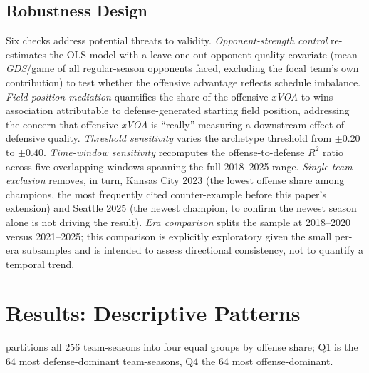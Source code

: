 \documentclass[12pt,a4paper]{article}
\newcommand{\xvoa}{\textit{xVOA}}
\newcommand{\gds}{\textit{GDS}}
\begin{document}
\subsection{Robustness Design}
\label{sec:robustness-design}

Six checks address potential threats to validity. \textit{Opponent-strength control} re-estimates the OLS model with a leave-one-out opponent-quality covariate (mean \gds{}/game of all regular-season opponents faced, excluding the focal team's own contribution) to test whether the offensive advantage reflects schedule imbalance. \textit{Field-position mediation} \citep{baron1986moderator} quantifies the share of the offensive-\xvoa{}-to-wins association attributable to defense-generated starting field position, addressing the concern that offensive \xvoa{} is ``really'' measuring a downstream effect of defensive quality. \textit{Threshold sensitivity} varies the archetype threshold from $\pm0.20$ to $\pm0.40$. \textit{Time-window sensitivity} recomputes the offense-to-defense $R^2$ ratio across five overlapping windows spanning the full 2018--2025 range. \textit{Single-team exclusion} removes, in turn, Kansas City 2023 (the lowest offense share among champions, the most frequently cited counter-example before this paper's extension) and Seattle 2025 (the newest champion, to confirm the newest season alone is not driving the result). \textit{Era comparison} splits the sample at 2018--2020 versus 2021--2025; this comparison is explicitly exploratory given the small per-era subsamples and is intended to assess directional consistency, not to quantify a temporal trend.

\section{Results: Descriptive Patterns}
\label{sec:descriptive}

 partitions all 256 team-seasons into four equal groups by offense share; Q1 is the 64 most defense-dominant team-seasons, Q4 the 64 most offense-dominant.
\end{document}
